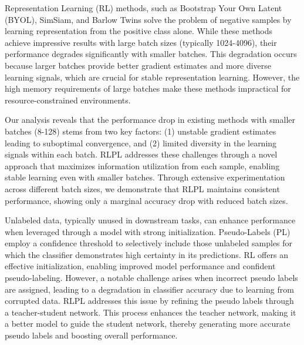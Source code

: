 Representation Learning (RL) methods, such as Bootstrap Your Own Latent (BYOL), SimSiam, and Barlow Twins solve the problem of negative samples by learning representation from the positive class alone. While these methods achieve impressive results with large batch sizes (typically 1024-4096), their performance degrades significantly with smaller batches. This degradation occurs because larger batches provide better gradient estimates and more diverse learning signals, which are crucial for stable representation learning. However, the high memory requirements of large batches make these methods impractical for resource-constrained environments.

Our analysis reveals that the performance drop in existing methods with smaller batches (8-128) stems from two key factors: (1) unstable gradient estimates leading to suboptimal convergence, and (2) limited diversity in the learning signals within each batch. RLPL addresses these challenges through a novel approach that maximizes information utilization from each sample, enabling stable learning even with smaller batches. Through extensive experimentation across different batch sizes, we demonstrate that RLPL maintains consistent performance, showing only a marginal accuracy drop with reduced batch sizes.

Unlabeled data, typically unused in downstream tasks, can enhance performance when leveraged through a model with strong initialization. Pseudo-Labels (PL) \cite{lee2013pseudo} employ a confidence threshold to selectively include those unlabeled samples for which the classifier demonstrates high certainty in its predictions. RL offers an effective initialization, enabling improved model performance and confident pseudo-labeling. However, a notable challenge arises when incorrect pseudo labels are assigned, leading to a degradation in classifier accuracy due to learning from corrupted data. RLPL addresses this issue by refining the pseudo labels through a teacher-student network. This process enhances the teacher network, making it a better model to guide the student network, thereby generating more accurate pseudo labels and boosting overall performance.




